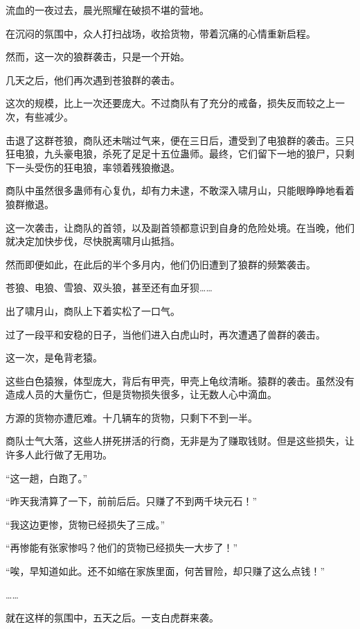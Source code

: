 
\begin{this_body}



流血的一夜过去，晨光照耀在破损不堪的营地。

在沉闷的氛围中，众人打扫战场，收拾货物，带着沉痛的心情重新启程。

然而，这一次的狼群袭击，只是一个开始。

几天之后，他们再次遇到苍狼群的袭击。

这次的规模，比上一次还要庞大。不过商队有了充分的戒备，损失反而较之上一次，有些减少。

击退了这群苍狼，商队还未喘过气来，便在三日后，遭受到了电狼群的袭击。三只狂电狼，九头豪电狼，杀死了足足十五位蛊师。最终，它们留下一地的狼尸，只剩下一头受伤的狂电狼，率领着残狼撤退。

商队中虽然很多蛊师有心复仇，却有力未逮，不敢深入啸月山，只能眼睁睁地看着狼群撤退。

这一次袭击，让商队的首领，以及副首领都意识到自身的危险处境。在当晚，他们就决定加快步伐，尽快脱离啸月山抵挡。

然而即便如此，在此后的半个多月内，他们仍旧遭到了狼群的频繁袭击。

苍狼、电狼、雪狼、双头狼，甚至还有血牙狈……

出了啸月山，商队上下着实松了一口气。

过了一段平和安稳的日子，当他们进入白虎山时，再次遭遇了兽群的袭击。

这一次，是龟背老猿。

这些白色猿猴，体型庞大，背后有甲壳，甲壳上龟纹清晰。猿群的袭击。虽然没有造成人员的大量伤亡，但是货物损失很多，让无数人心中滴血。

方源的货物亦遭厄难。十几辆车的货物，只剩下不到一半。

商队士气大落，这些人拼死拼活的行商，无非是为了赚取钱财。但是这些损失，让许多人此行做了无用功。

“这一趟，白跑了。”

“昨天我清算了一下，前前后后。只赚了不到两千块元石！”

“我这边更惨，货物已经损失了三成。”

“再惨能有张家惨吗？他们的货物已经损失一大步了！”

“唉，早知道如此。还不如缩在家族里面，何苦冒险，却只赚了这么点钱！”

……

就在这样的氛围中，五天之后。一支白虎群来袭。


\end{this_body}
